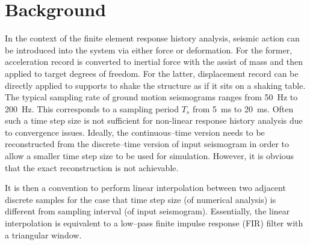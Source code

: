 \section{Background}
In the context of the finite element response history analysis, seismic action can be introduced into the system via either force or deformation. For the former, acceleration record is converted to inertial force with the assist of mass and then applied to target degrees of freedom. For the latter, displacement record can be directly applied to supports to shake the structure as if it sits on a shaking table.
The typical sampling rate of ground motion seismograms ranges from \SI{50}{\hertz} to \SI{200}{\hertz}. This corresponds to a sampling period $T_s$ from \SI{5}{\milli\second} to \SI{20}{\milli\second}. Often such a time step size is not sufficient for non-linear response history analysis due to convergence issues. Ideally, the continuous--time version needs to be reconstructed from the discrete--time version of input seismogram in order to allow a smaller time step size to be used for simulation. However, it is obvious that the exact reconstruction is not achievable.

It is then a convention to perform linear interpolation between two adjacent discrete samples for the case that time step size (of numerical analysis) is different from sampling interval (of input seismogram). Essentially, the linear interpolation is equivalent to a low--pass finite impulse response (FIR) filter with a triangular window.

